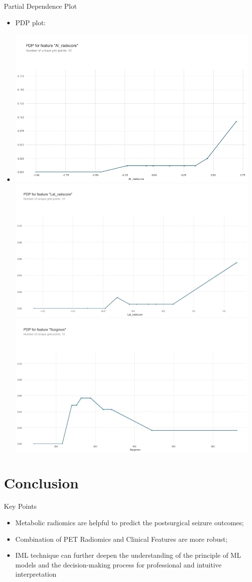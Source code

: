 \documentclass[
  11pt,
  ignorenonframetext,
  fontset=fandol]{beamer}
\begin{document}
\begin{frame}{Partial Dependence Plot}
\protect\hypertarget{partial-dependence-plot}{}
\begin{itemize}[<+->]
\item PDP plot:
\item

\begin{center}\includegraphics[width=0.35\linewidth]{images/pdp_ai} \includegraphics[width=0.35\linewidth]{images/pdp_Lat} \includegraphics[width=0.35\linewidth]{images/pdp_surgmon} \end{center}
\end{itemize}
\end{frame}

\hypertarget{conclusion}{%
\section{Conclusion}\label{conclusion}}

\begin{frame}{Key Points}
\protect\hypertarget{key-points}{}
\begin{itemize}[<+->]
\item Metabolic radiomics are helpful to predict the postsurgical seizure outcomes;
\bigskip
\item Combination of PET Radiomics and Clinical Features are more robust;
\bigskip
\item IML technique can further deepen the understanding of the principle of ML models and the decision-making process for professional and intuitive interpretation
\end{itemize}
\end{frame}
\end{document}
